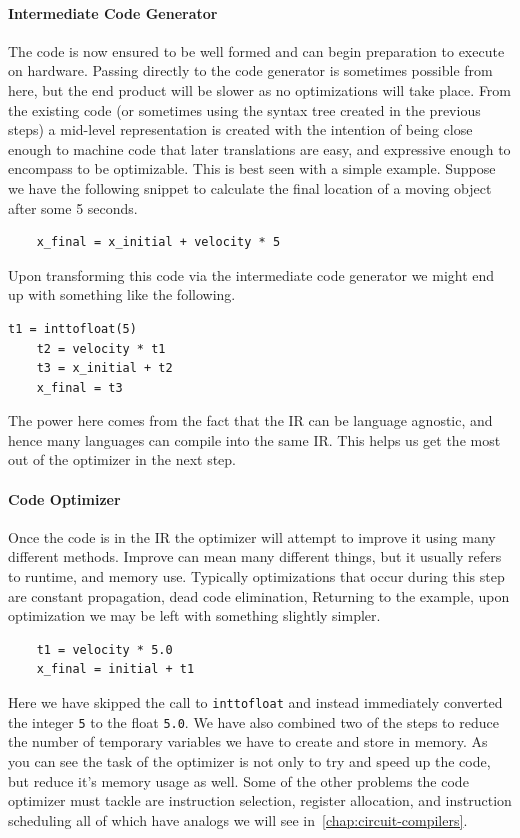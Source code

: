 \paragraph{Intermediate Code Generator}
The code is now ensured to be well formed and can begin preparation to execute on hardware.
Passing directly to the code generator is sometimes possible from here, but the end product will be slower as no optimizations will take place.
From the existing code (or sometimes using the syntax tree created in the previous steps) a mid-level representation is created with the intention of being close enough to machine code that later translations are easy, and expressive enough to encompass to be optimizable.
This is best seen with a simple example.
Suppose we have the following snippet to calculate the final location of a moving object after some 5 seconds.
\begin{lstlisting}
    x_final = x_initial + velocity * 5
\end{lstlisting}
Upon transforming this code via the intermediate code generator we might end up with something like the following.
\begin{lstlisting}[label=lst:ir]
    t1 = inttofloat(5)
    t2 = velocity * t1
    t3 = x_initial + t2
    x_final = t3
\end{lstlisting}
The power here comes from the fact that the \acf{IR} can be language agnostic, and hence many languages can compile into the same \ac{IR}.
This helps us get the most out of the optimizer in the next step.

\paragraph{Code Optimizer}
Once the code is in the \ac{IR} the optimizer will attempt to improve it using many different methods.
Improve can mean many different things, but it usually refers to runtime, and memory use.
Typically optimizations that occur during this step are constant propagation, dead code elimination,
Returning to the example, upon optimization we may be left with something slightly simpler.
\begin{lstlisting}
    t1 = velocity * 5.0
    x_final = initial + t1
\end{lstlisting}
Here we have skipped the call to \texttt{inttofloat} and instead immediately converted the integer \texttt{5} to the float \texttt{5.0}.
We have also combined two of the steps to reduce the number of temporary variables we have to create and store in memory.
As you can see the task of the optimizer is not only to try and speed up the code, but reduce it's memory usage as well.
Some of the other problems the code optimizer must tackle are instruction selection, register allocation, and instruction scheduling all of which have analogs we will see in~\cref{chap:circuit-compilers}.

